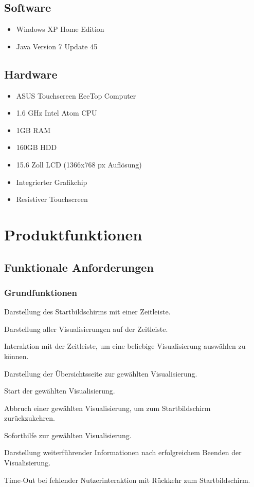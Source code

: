 \documentclass{article}
\begin{document}
\subsection{Software}

\begin{itemize}
	\item Windows XP Home Edition
	\item Java Version 7 Update 45
\end{itemize}

\subsection{Hardware}

\begin{itemize}
	\item ASUS Touchscreen \gls{EeeTop} Computer
	\item 1.6 GHz Intel Atom CPU
	\item 1GB RAM
	\item 160GB HDD
	\item 15.6 Zoll LCD (1366x768 px Auflösung)
	\item Integrierter Grafikchip
	\item Resistiver Touchscreen
\end{itemize}

\section{Produktfunktionen}

\subsection{Funktionale Anforderungen}

\subsubsection{Grundfunktionen}

\begin{FA}[start=100]
  \item Darstellung des Startbildschirms mit einer Zeitleiste.
  \item Darstellung aller Visualisierungen auf der Zeitleiste.
  \item Interaktion mit der Zeitleiste, um eine beliebige Visualisierung auswählen zu können.
  \item Darstellung der Übersichtsseite zur gewählten Visualisierung.
  \item Start der gewählten Visualisierung.
  \item Abbruch einer gewählten Visualisierung, um zum Startbildschirm zurückzukehren.
  \item Soforthilfe zur gewählten Visualisierung.
  \item Darstellung weiterführender Informationen nach erfolgreichem Beenden der Visualisierung.
  \item Time-Out bei fehlender Nutzerinteraktion mit Rückkehr zum Startbildschirm.
\end{FA}
\end{document}

